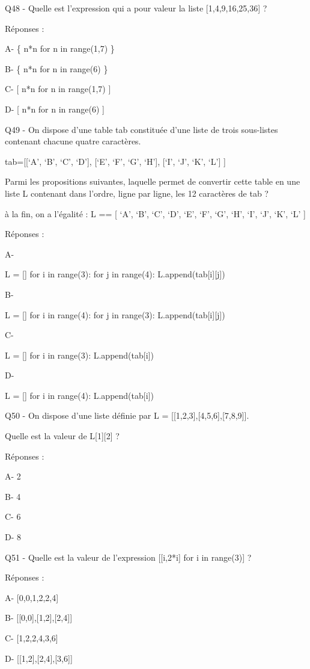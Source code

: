 \documentclass[
]{book}
\begin{document}
Q48 - Quelle est l'expression qui a pour valeur la liste {[}1,4,9,16,25,36{]} ?

Réponses :

A- \{ n*n for n in range(1,7) \}

B- \{ n*n for n in range(6) \}

C- {[} n*n for n in range(1,7) {]}

D- {[} n*n for n in range(6) {]}

Q49 - On dispose d'une table tab constituée d'une liste de trois sous-listes contenant chacune quatre caractères.

tab={[}{[}`A', `B', `C', `D'{]},
{[}`E', `F', `G', `H'{]},
{[}`I', `J', `K', `L'{]} {]}

Parmi les propositions suivantes, laquelle permet de convertir cette table en une liste L contenant dans l'ordre, ligne par ligne, les 12 caractères de tab ?

à la fin, on a l'égalité :
L == {[} `A', `B', `C', `D', `E', `F', `G', `H', `I', `J', `K', `L' {]}

Réponses :

A-

L = {[}{]}
for i in range(3):
for j in range(4):
L.append(tab{[}i{]}{[}j{]})

B-

L = {[}{]}
for i in range(4):
for j in range(3):
L.append(tab{[}i{]}{[}j{]})

C-

L = {[}{]}
for i in range(3):
L.append(tab{[}i{]})

D-

L = {[}{]}
for i in range(4):
L.append(tab{[}i{]})

Q50 - On dispose d'une liste définie par L = {[}{[}1,2,3{]},{[}4,5,6{]},{[}7,8,9{]}{]}.

Quelle est la valeur de L{[}1{]}{[}2{]} ?

Réponses :

A- 2

B- 4

C- 6

D- 8

Q51 - Quelle est la valeur de l'expression {[}{[}i,2*i{]} for i in range(3){]} ?

Réponses :

A- {[}0,0,1,2,2,4{]}

B- {[}{[}0,0{]},{[}1,2{]},{[}2,4{]}{]}

C- {[}1,2,2,4,3,6{]}

D- {[}{[}1,2{]},{[}2,4{]},{[}3,6{]}{]}
\end{document}

